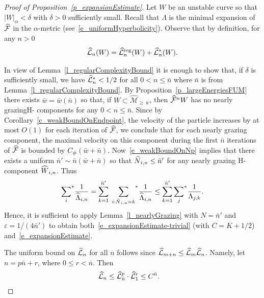 \documentclass[10pt]{amsart}
\theoremstyle{definition}\newtheorem{defi}[theo]{Definition}\newtheorem{rema}[theo]{Remark}\newtheorem{exam}[theo]{Example}\newtheorem{exem}[theo]{Example}\newtheorem{nota}[theo]{Notation}
\newcommand{\eps}{\varepsilon}
\newcommand{\const}{C_\#}
\newcommand{\cm}{\mathcal{F}}
\newcommand{\csp}{\mathcal{M}}
\newcommand{\cmp}{\hat\cm}
\newcommand{\cspil}[1]{\widehat{\csp}_{\ge\,#1}}
\newcommand{\Hcomp}{H-\hskip0pt component}
\newcommand{\Hcomps}{H-\hskip0pt components}
\newcommand{\hzreg}{\hat{\cL}^\text{reg}}
\newcommand{\adm}{_{\alpha^{+}}}
\newcommand{\Np}{\hat N}
\newcommand{\cL}{\mathcal{L}}
\renewcommand{\adm}{_{\alpha}}
\let\oldhat\hat
\renewcommand*{\hat}[1]{\mathchoice{\widehat{#1}}{\widehat{#1}}{\oldhat{#1}}{\oldhat{#1}}}
\begin{document}
\begin{proof}[{Proof of Proposition~\ref{p_expansionEstimate}}]
Let $W$ be an unstable curve so that $|W|\adm < \delta$ with $\delta > 0$ sufficiently small. Recall that $\Lambda$ is the minimal expansion of $\cmp$ in the $\alpha$-metric (see~\eqref{e_uniformHyperbolicity}). Observe that by definition, for any $n > 0$
\begin{align*}
\hat \cL_{n}(W) = \hzreg_{n}(W)+\hat \cL^{*}_{n}(W).
\end{align*}


In view of Lemma~\ref{l_regularComplexityBound} it is enough to show that, if $\delta$ is sufficiently small, we have $\hat \cL^{*}_{n} < 1/2$ for all $0 < n\le\bar n$ where $\bar n$ is from Lemma~\ref{l_regularComplexityBound}. By Proposition~\ref{p_largeEnergiesFUM} there exists $\bar w = \bar w(\bar n)$ so that, if $W\subset\cspil{\bar w}$, then $\cmp^{n}W$ has no nearly grazing\linebreak \Hcomps{} for any $0 < n\le\bar n$. Since by Corollary~\ref{c_weakBoundOnEndpoint}, the velocity of the particle increases by at most $O(1)$ for each iteration of $\cmp$, we conclude that for each nearly grazing component, the maximal velocity on this component during the first $\bar n$ iterations of $\cmp$ is bounded by $\const (\bar w+\bar n).$ Now~\eqref{e_weakBoundOnNp} implies that there exists a uniform $\bar n'\sim \bar n(\bar w+\bar n)$ so that $\Np_{i,n}\le\bar n'$ for any nearly grazing \Hcomp{} $\hat W_{i, n}$. Thus
\begin{align*}
{\sum_i}^*\frac1{\hat\Lambda_{i,n}} =
\sum_{k = 1}^{\bar n'}\;{\sum_{i:\Np_{i, n} = k}}^*
\frac1{\hat\Lambda_{i, n}} \le
\sum_{k = 1}^{\bar n'}{\sum_j}^*\frac1{\Lambda_{j,k}}.
\end{align*}
Hence, it is sufficient to apply Lemma~\ref{l_nearlyGrazing} with $N = \bar n'$ and $\eps = 1/(4\bar n')$ to obtain both~\eqref{e_expansionEstimate-trivial} (with $C = K+1/2$) and~\eqref{e_expansionEstimate}.

The uniform bound on $\hat \cL_{n}$ for all $n$ follows since $\hat\cL_{m+n}\le\hat\cL_{m}\hat\cL_{n}$. Namely, let $n = p\bar n+r$, where $0\le r < \bar n$. Then
\begin{align*}
\hat\cL_{n}\le\hat\cL_{\bar n}^{p}\cdot
\hat\cL_{1}^{r}&\le C^{\bar n}.\qedhere
\end{align*}
\end{proof}
\end{document}
